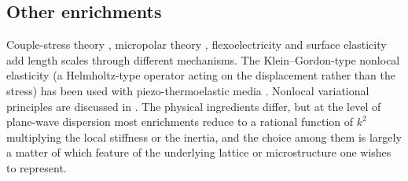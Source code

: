 \subsection{Other enrichments}
Couple-stress theory \citep{MindlinTiersten1962}, micropolar theory \citep{Eringen1966a,Eringen1999}, flexoelectricity and surface elasticity add length scales through different mechanisms. The Klein--Gordon-type nonlocal elasticity \citep{Lazar2022} (a Helmholtz-type operator acting on the displacement rather than the stress) has been used with piezo-thermoelastic media \citep{Das2026}. Nonlocal variational principles are discussed in \citep{Polizzotto2001}. The physical ingredients differ, but at the level of plane-wave dispersion most enrichments reduce to a rational function of $k^2$ multiplying the local stiffness or the inertia, and the choice among them is largely a matter of which feature of the underlying lattice or microstructure one wishes to represent.

